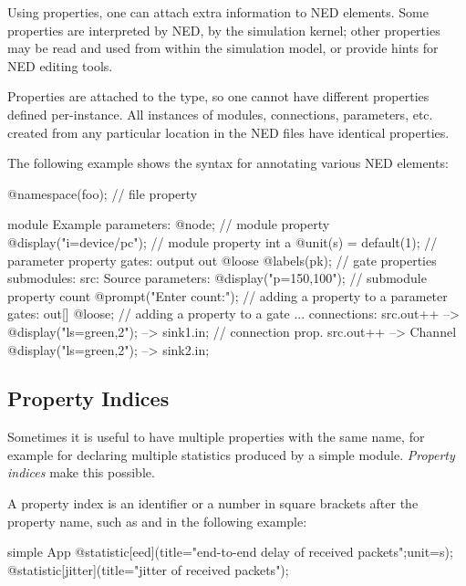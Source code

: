 
Using properties, one can attach extra information to NED elements. Some
properties are interpreted by NED, by the simulation kernel; other properties
may be read and used from within the simulation model, or provide hints for NED
editing tools.

Properties are attached to the type, so one cannot have different properties
defined per-instance. All instances of modules, connections, parameters, etc.
created from any particular location in the NED files have identical properties.

The following example shows the syntax for annotating various NED elements:

\begin{ned}
@namespace(foo);  // file property

module Example
{
    parameters:
       @node;   // module property
       @display("i=device/pc");   // module property
       int a @unit(s) = default(1); // parameter property
    gates:
       output out @loose @labels(pk);  // gate properties
    submodules:
       src: Source {
           parameters:
              @display("p=150,100");  // submodule property
              count @prompt("Enter count:"); // adding a property to a parameter
           gates:
              out[] @loose;  // adding a property to a gate
       }
       ...
    connections:
       src.out++ --> { @display("ls=green,2"); } --> sink1.in; // connection prop.
       src.out++ --> Channel { @display("ls=green,2"); } --> sink2.in;
}
\end{ned}


\subsection{Property Indices}
\label{sec:ned-lang:property-indices}

Sometimes it is useful to have multiple properties with the same name, for
example for declaring multiple statistics produced by a simple module.
\textit{Property indices} make this possible.

A property index is an identifier or a number in square brackets after the
property name, such as  and  in the following example:

\begin{ned}
simple App {
    @statistic[eed](title="end-to-end delay of received packets";unit=s);
    @statistic[jitter](title="jitter of received packets");
}
\end{ned}

